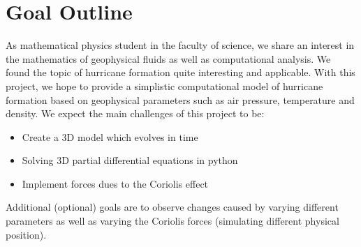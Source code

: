 \chapter{Goal Outline}
As mathematical physics student in the faculty of science, we share an interest in the mathematics of geophysical fluids as well as computational analysis. We found the topic of hurricane formation quite interesting and applicable. With this project, we hope to provide a simplistic computational model of hurricane formation based on geophysical parameters such as air pressure, temperature and density. We expect the main challenges of this project to be:
\begin{itemize}
    \item Create a 3D model which evolves in time
    \item Solving 3D partial differential equations in python
    \item Implement forces dues to the Coriolis effect 
\end{itemize}
Additional (optional) goals are to observe changes caused by varying different parameters as well as varying the Coriolis forces (simulating different physical position).